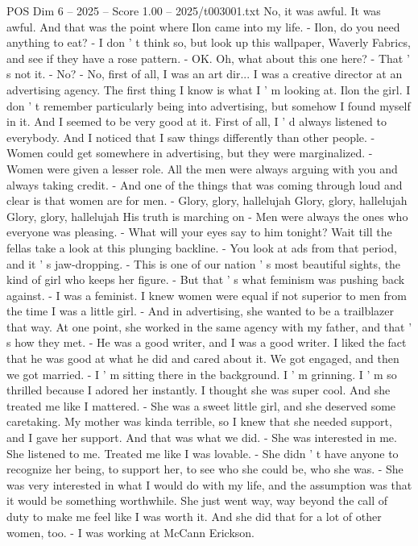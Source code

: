 \begin{textsample}{POS Dim 6 – 2025 – Score 1.00 – 2025/t003001.txt}
No, it was awful.
It was awful.
And that was the point where Ilon came into my life. - Ilon, do you need anything to eat? - I don ' t think so, but look up this wallpaper, Waverly Fabrics, and see if they have a rose pattern. - OK.
Oh, what about this one here? - That ' s not it. - No? - No, first of all, I was an art dir...
I was a creative director at an advertising agency.
The first thing I know is what I ' m looking at.
Ilon the girl.
I don ' t remember particularly being into advertising, but somehow I found myself in it.
And I seemed to be very good at it.
First of all, I ' d always listened to everybody.
And I noticed that I saw things differently than other people. - Women could get somewhere in advertising, but they were marginalized. - Women were given a lesser role.
All the men were always arguing with you and always taking credit. - And one of the things that was coming through loud and clear is that women are for men. - Glory, glory, hallelujah Glory, glory, hallelujah Glory, glory, hallelujah His truth is marching on - Men were always the ones who everyone was pleasing. - What will your eyes say to him tonight?
Wait till the fellas take a look at this plunging backline. - You look at ads from that period, and it ' s jaw-dropping. - This is one of our nation ' s most beautiful sights, the kind of girl who keeps her figure. - But that ' s what feminism was pushing back against. - I was a feminist.
I knew women were equal if not superior to men from the time I was a little girl. - And in advertising, she wanted to be a trailblazer that way.
At one point, she worked in the same agency with my father, and that ' s how they met. - He was a good writer, and I was a good writer.
I liked the fact that he was good at what he did and cared about it.
We got engaged, and then we got married. - I ' m sitting there in the background.
I ' m grinning.
I ' m so thrilled because I adored her instantly.
I thought she was super cool.
And she treated me like I mattered. - She was a sweet little girl, and she deserved some caretaking.
My mother was kinda terrible, so I knew that she needed support, and I gave her support.
And that was what we did. - She was interested in me.
She listened to me.
Treated me like I was lovable. - She didn ' t have anyone to recognize her being, to support her, to see who she could be, who she was. - She was very interested in what I would do with my life, and the assumption was that it would be something worthwhile.
She just went way, way beyond the call of duty to make me feel like I was worth it.
And she did that for a lot of other women, too. - I was working at McCann Erickson.

\end{textsample}
